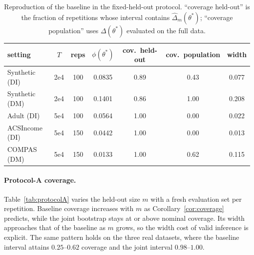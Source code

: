 \documentclass[11pt]{article}
\newcommand{\dhat}{\hat\Delta}
\begin{document}
\begin{table}[t]
\centering
\small
\setlength{\tabcolsep}{4pt}
\caption{Reproduction of the baseline in the fixed-held-out protocol.  ``coverage held-out'' is the
fraction of repetitions whose interval contains $\dhat_m(\theta^*)$; ``coverage population'' uses
$\Delta(\theta^*)$ evaluated on the full data.}
\label{tab:repro}
\begin{tabular}{lcccccc}
\toprule
setting & $T$ & reps & $\phi(\theta^*)$ & cov.\ held-out & cov.\ population & width \\
\midrule
Synthetic (DI) & 2e4 & 100 & 0.0835 & 0.89 & 0.43 & 0.077 \\
Synthetic (DM) & 2e4 & 100 & 0.1401 & 0.86 & 1.00 & 0.208 \\
Adult (DI)     & 5e4 & 100 & 0.0564 & 1.00 & 0.00 & 0.022 \\
ACSIncome (DI) & 5e4 & 150 & 0.0442 & 1.00 & 0.00 & 0.013 \\
COMPAS (DM)    & 5e4 & 150 & 0.0133 & 1.00 & 0.62 & 0.115 \\
\bottomrule
\end{tabular}
\end{table}

\paragraph{Protocol-A coverage.}
Table~\ref{tab:protocolA} varies the held-out size $m$ with a fresh evaluation set per repetition.
Baseline coverage increases with $m$ as Corollary~\ref{cor:coverage} predicts, while the joint
bootstrap stays at or above nominal coverage.  Its width approaches that of the baseline as $m$ grows,
so the width cost of valid inference is explicit.  The same pattern holds on the three real
datasets, where the baseline interval attains $0.25$--$0.62$ coverage and the joint interval
$0.98$--$1.00$.
\end{document}
